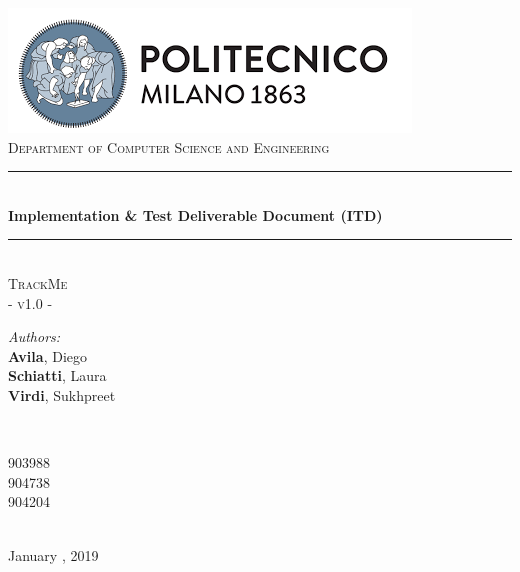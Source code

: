 \documentclass[a4paper, hidelinks, 12pt]{report}
\begin{document}
	\begin{titlepage}
		\centering
		\vspace*{0.7 cm}
		\includegraphics[scale = 0.85]{../Assets/PolimiLogo.png}\\[1.6 cm]
		\textsc{\large Department of Computer Science and Engineering}\\[1.8 cm]
		
		\rule{\linewidth}{0.2 mm} \\[0.4 cm]
		{ \huge \bfseries Implementation \& Test Deliverable Document (ITD)}\\
		\rule{\linewidth}{0.2 mm} \\[1.5 cm]
		
		\textsc{\Large TrackMe}\\[0.5 cm]
		\textsc{\large - v1.0 -}\\[1 cm]
		
		\begin{minipage}{0.4\textwidth}
			\begin{flushleft} \large
				\emph{Authors:}\\
				\textbf{Avila}, Diego \\
				\textbf{Schiatti}, Laura \\
				\textbf{Virdi}, Sukhpreet
			\end{flushleft}
		\end{minipage}~
		\begin{minipage}{0.4\textwidth}
			\begin{flushright} \large
				903988 \\
				904738 \\
				904204
			\end{flushright}
		\end{minipage}\\[2 cm]
		
		{\large January  , 2019}\\[2 cm]
		
		\vfill
	\end{titlepage}
	
	\tableofcontents
	\newpage
	\listoffigures
	\listoftables
	\clearpage
	\setcounter{page}{1}
	
\end{document}

